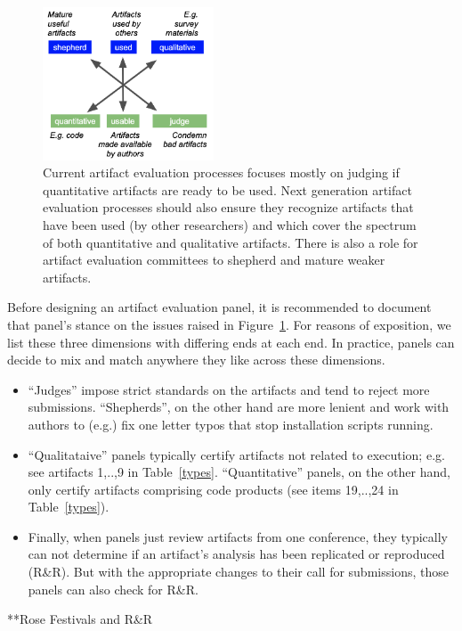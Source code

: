 \documentclass[smallextended]{svjour3}       %
\begin{document}
\begin{figure}
\includegraphics[width=2in]{dimensions.png}
\caption{Current
artifact evaluation processes focuses mostly on judging if quantitative artifacts are ready to be used.
Next generation artifact evaluation processes should also ensure they recognize artifacts that have been used (by other researchers) and which cover the spectrum of both quantitative and qualitative artifacts. There is also a role for artifact evaluation committees to shepherd and mature weaker artifacts.}\label{dims}\end{figure} 

Before designing an artifact evaluation panel, it is recommended to document that panel's stance on the issues raised in Figure~\ref{dims}. For reasons of exposition, we list these three dimensions with differing ends at each end. In practice, panels can decide to mix and match anywhere they like across these dimensions.
\begin{itemize}
\item ``Judges'' impose strict standards on the artifacts and tend to reject more submissions. ``Shepherds'', on the other hand are more lenient and work with authors to (e.g.) fix one letter typos that stop installation scripts running.
\item ``Qualitataive'' panels typically certify artifacts not related to execution; e.g. see artifacts 1,..,9 in Table~\ref{types}. 
``Quantitative'' panels, on the other hand, only certify artifacts comprising code products
(see items 19,..,24 in Table~\ref{types}). 
\item
Finally, when panels just review artifacts from one conference, they typically
can not determine if an artifact's analysis has been replicated or reproduced (R\&R).
But with  the appropriate changes to their call for submissions, those panels can also check for R\&R.
\end{itemize}



**Rose Festivals and R&R
\end{document}
